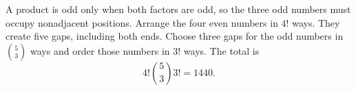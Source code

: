 A product is odd only when both factors are odd, so the three odd numbers must occupy nonadjacent positions. Arrange the four even numbers in $4!$ ways. They create five gaps, including both ends. Choose three gaps for the odd numbers in $\binom53$ ways and order those numbers in $3!$ ways. The total is
\[
\boxed{4!\binom53 3!=1440}.
\]
